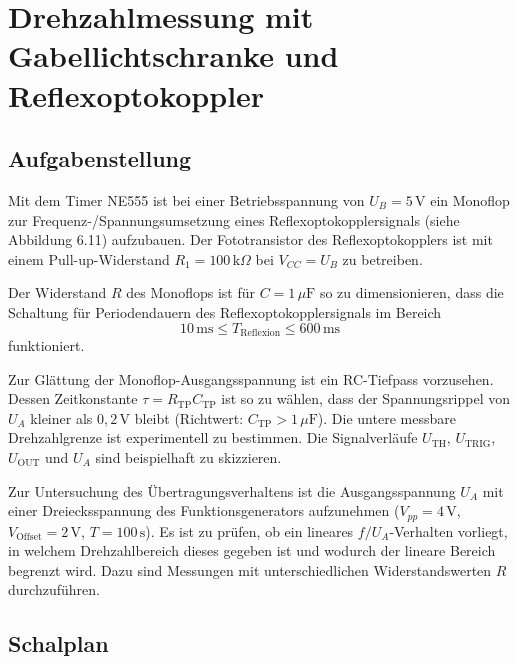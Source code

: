 \section{Drehzahlmessung mit Gabellichtschranke und Reﬂexoptokoppler}

\subsection{Aufgabenstellung}

Mit dem Timer NE555 ist bei einer Betriebsspannung von \(U_B = 5\,\text{V}\) ein Monoflop zur Frequenz-/Spannungsumsetzung eines Reflexoptokopplersignals (siehe Abbildung 6.11) aufzubauen. Der Fototransistor des Reflexoptokopplers ist mit einem Pull-up-Widerstand \(R_1 = 100\,\text{k}\Omega\) bei \(V_{CC}=U_B\) zu betreiben.

Der Widerstand \(R\) des Monoflops ist für \(C = 1\,\mu\text{F}\) so zu dimensionieren, dass die Schaltung für Periodendauern des Reflexoptokopplersignals im Bereich
\[
	10\,\text{ms} \leq T_{\text{Reflexion}} \leq 600\,\text{ms}
\]
funktioniert.

Zur Glättung der Monoflop-Ausgangsspannung ist ein RC-Tiefpass vorzusehen. Dessen Zeitkonstante \(\tau = R_{\text{TP}}C_{\text{TP}}\) ist so zu wählen, dass der Spannungsrippel von \(U_A\) kleiner als \(0{,}2\,\text{V}\) bleibt (Richtwert: \(C_{\text{TP}} > 1\,\mu\text{F}\)). Die untere messbare Drehzahlgrenze ist experimentell zu bestimmen. Die Signalverläufe \(U_{\text{TH}}\), \(U_{\text{TRIG}}\), \(U_{\text{OUT}}\) und \(U_A\) sind beispielhaft zu skizzieren.

Zur Untersuchung des Übertragungsverhaltens ist die Ausgangsspannung \(U_A\) mit einer Dreiecksspannung des Funktionsgenerators aufzunehmen (\(V_{pp}=4\,\text{V}\), \(V_{\text{Offset}}=2\,\text{V}\), \(T=100\,\text{s}\)). Es ist zu prüfen, ob ein lineares \(f/U_A\)-Verhalten vorliegt, in welchem Drehzahlbereich dieses gegeben ist und wodurch der lineare Bereich begrenzt wird. Dazu sind Messungen mit unterschiedlichen Widerstandswerten \(R\) durchzuführen.

\subsection{Schalplan}

